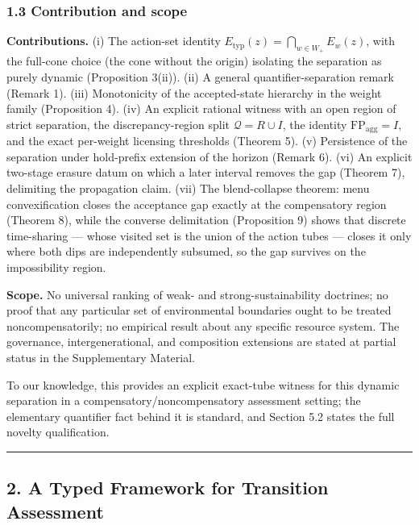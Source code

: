 \documentclass[11pt]{article}
\begin{document}
\subsubsection{1.3 Contribution and scope}\label{contribution-and-scope}

\textbf{Contributions.} (i) The action-set identity \(E_{\mathrm{typ}}(z) = \bigcap_{w \in W_+} E_w(z)\), with the full-cone
choice (the cone without the origin) isolating the separation as purely
dynamic (Proposition 3(ii)). (ii) A general quantifier-separation remark
(Remark 1). (iii) Monotonicity of the accepted-state hierarchy in the
weight family (Proposition 4). (iv) An explicit rational witness with an
open region of strict separation, the discrepancy-region split
\(\mathcal{Q} = R \cup I\), the identity
\(\mathrm{FP}_{\mathrm{agg}} = I\), and the exact per-weight licensing
thresholds (Theorem 5). (v) Persistence of the separation under
hold-prefix extension of the horizon (Remark 6). (vi) An explicit
two-stage erasure datum on which a later interval removes the gap
(Theorem 7), delimiting the propagation claim. (vii) The blend-collapse
theorem: menu convexification closes the acceptance gap exactly at the compensatory region (Theorem 8), while the converse
delimitation (Proposition 9) shows that discrete time-sharing --- whose
visited set is the union of the action tubes --- closes it only where
both dips are independently subsumed, so the gap survives on the
impossibility region.

\textbf{Scope.} No universal ranking of weak- and strong-sustainability doctrines; no proof that any particular set of environmental boundaries ought to be treated noncompensatorily; no empirical result about any specific resource system. The governance, intergenerational, and composition extensions are stated at partial status in the Supplementary Material.

To our knowledge, this provides an explicit exact-tube witness for this
dynamic separation in a compensatory/noncompensatory assessment setting;
the elementary quantifier fact behind it is standard, and Section 5.2
states the full novelty qualification.

\begin{center}\rule{0.5\linewidth}{0.5pt}\end{center}

\subsection{2. A Typed Framework for Transition
Assessment}\label{a-typed-framework-for-transition-assessment}
\end{document}
